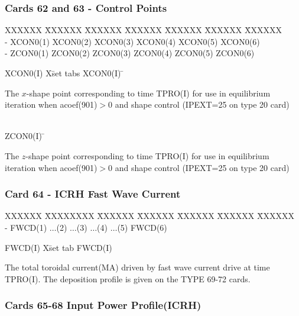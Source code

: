 \newpage \subsubsection{Cards 62 and 63 - Control Points}
\begin{tabbing}
XXXXXX \= XXXXXX \= XXXXXX \= XXXXXX \= XXXXXX \= XXXXXX \=
XXXXXX       \\
\footnotesize  - \>\footnotesize XCON0(1)  \>\footnotesize XCON0(2) \>\footnotesize
XCON0(3) \>\footnotesize XCON0(4) \>\footnotesize XCON0(5) \>\footnotesize XCON0(6)\\
\footnotesize  - \>\footnotesize ZCON0(1)  \>\footnotesize ZCON0(2) \>\footnotesize
ZCON0(3) \>\footnotesize ZCON0(4) \>\footnotesize ZCON0(5) \>\footnotesize ZCON0(6)
\end{tabbing}
\begin{tabbing}
XCON0(I) X\=  set tabs \kill
XCON0(I)  \=  \parbox[t]{\width}{The $x$-shape point corresponding to time
TPRO(I) for use in equilibrium iteration when acoef(901)$>$0
and shape control (IPEXT=25 on type 20 card)}\\
ZCON0(I)  \=  \parbox[t]{\width}{The $z$-shape point corresponding to time
TPRO(I) for use in equilibrium iteration when acoef(901)$>$0
and shape control (IPEXT=25 on type 20 card)}
\end{tabbing}
\newpage \subsubsection{Card 64 - ICRH Fast Wave Current}
\begin{tabbing}
XXXXXX \= XXXXXXXX \= XXXXXX \= XXXXXX \= XXXXXX \= XXXXXX \=
XXXXXX       \\
\footnotesize - \>\footnotesize  FWCD(1) \>\footnotesize $\ldots$(2) \>\footnotesize
$\ldots$(3) \>\footnotesize $\ldots$(4) \>\footnotesize $\ldots$(5) \>\footnotesize FWCD(6)
\\
\end{tabbing}
\begin{tabbing}
FWCD(I) X\= set tab \kill
FWCD(I) \> \parbox[t]{\width}{The total toroidal current(MA) driven by fast wave current
drive at time TPRO(I).  The deposition profile is given on the TYPE 69-72 cards.}
\end{tabbing}
\newpage \subsubsection{Cards 65-68 Input Power Profile(ICRH)}
